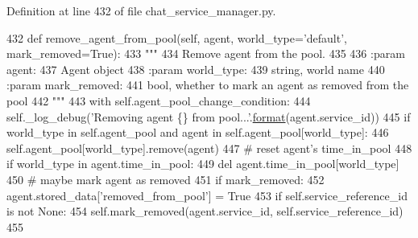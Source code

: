 Definition at line 432 of file chat\+\_\+service\+\_\+manager.\+py.


\begin{DoxyCode}
432     \textcolor{keyword}{def }remove\_agent\_from\_pool(self, agent, world\_type='default', mark\_removed=True):
433         \textcolor{stringliteral}{"""}
434 \textcolor{stringliteral}{        Remove agent from the pool.}
435 \textcolor{stringliteral}{}
436 \textcolor{stringliteral}{        :param agent:}
437 \textcolor{stringliteral}{            Agent object}
438 \textcolor{stringliteral}{        :param world\_type:}
439 \textcolor{stringliteral}{            string, world name}
440 \textcolor{stringliteral}{        :param mark\_removed:}
441 \textcolor{stringliteral}{            bool, whether to mark an agent as removed from the pool}
442 \textcolor{stringliteral}{        """}
443         with self.agent\_pool\_change\_condition:
444             self.\_log\_debug(\textcolor{stringliteral}{'Removing agent \{\} from pool...'}.\hyperlink{namespaceparlai_1_1chat__service_1_1services_1_1messenger_1_1shared__utils_a32e2e2022b824fbaf80c747160b52a76}{format}(agent.service\_id))
445             \textcolor{keywordflow}{if} world\_type \textcolor{keywordflow}{in} self.agent\_pool \textcolor{keywordflow}{and} agent \textcolor{keywordflow}{in} self.agent\_pool[world\_type]:
446                 self.agent\_pool[world\_type].remove(agent)
447                 \textcolor{comment}{# reset agent's time\_in\_pool}
448                 \textcolor{keywordflow}{if} world\_type \textcolor{keywordflow}{in} agent.time\_in\_pool:
449                     del agent.time\_in\_pool[world\_type]
450                 \textcolor{comment}{# maybe mark agent as removed}
451                 \textcolor{keywordflow}{if} mark\_removed:
452                     agent.stored\_data[\textcolor{stringliteral}{'removed\_from\_pool'}] = \textcolor{keyword}{True}
453                     \textcolor{keywordflow}{if} self.service\_reference\_id \textcolor{keywordflow}{is} \textcolor{keywordflow}{not} \textcolor{keywordtype}{None}:
454                         self.mark\_removed(agent.service\_id, self.service\_reference\_id)
455 
\end{DoxyCode}
\mbox{\label{classparlai_1_1chat__service_1_1core_1_1chat__service__manager_1_1ChatServiceManager_a68e25213509b2bd287ae8a69fd9a726f}} 
